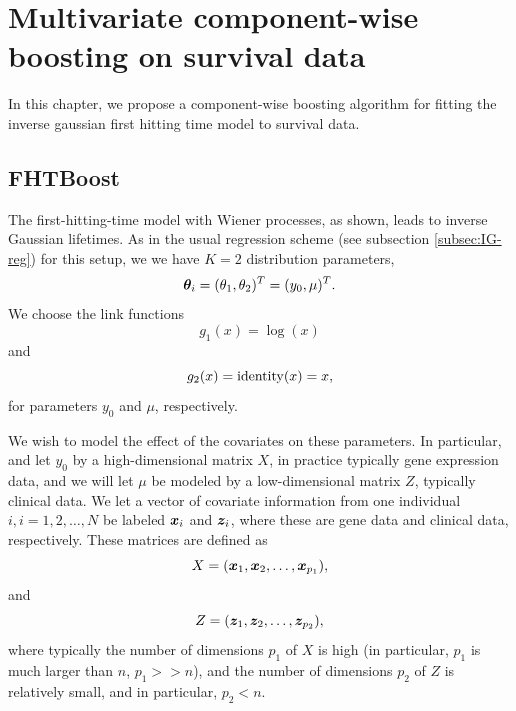 \chapter{Multivariate component-wise boosting on survival data}
\label{ch:FHTboost}
In this chapter, we propose a component-wise boosting algorithm for fitting the inverse gaussian first hitting time model to survival data.

\section{FHTBoost}
The first-hitting-time model with Wiener processes, as shown, leads to inverse Gaussian lifetimes.
As in the usual regression scheme (see subsection \ref{subsec:IG-reg}) for this setup, we we have $K=2$ distribution parameters,
\begin{equation}
    \boldsymbol{\theta}_i=(\theta_1,\theta_2)^T=(y_0,\mu)^T.
\end{equation}
We choose the link functions
\begin{equation}
    g_1(x)=\log(x)
\end{equation}
and
\begin{equation}
    g_2(x)=\operatorname{identity}(x)=x,
\end{equation}
for parameters $y_0$ and $\mu$, respectively.

We wish to model the effect of the covariates on these parameters.
In particular, and let $y_0$ by a high-dimensional matrix $X$, in practice typically gene expression data, and we will let $\mu$ be modeled by a low-dimensional matrix $Z$, typically clinical data.
We let a vector of covariate information from one individual $i,i=1,2,\ldots,N$ be labeled $\bm{x}_i$ and $\bm{z}_i$, where these are gene data and clinical data, respectively.
These matrices are defined as
\begin{equation}
    X=(\bm{x}_1,\bm{x}_2,\ldots,\bm{x}_{p_1}),
\end{equation}
and
\begin{equation}
    Z=(\bm{z}_1,\bm{z}_2,\ldots,\bm{z}_{p_2}),
\end{equation}
where typically the number of dimensions $p_1$ of $X$ is high (in particular, $p_1$ is much larger than $n$, $p_1 >> n$), and the number of dimensions $p_2$ of $Z$ is relatively small, and in particular, $p_2 < n$.

